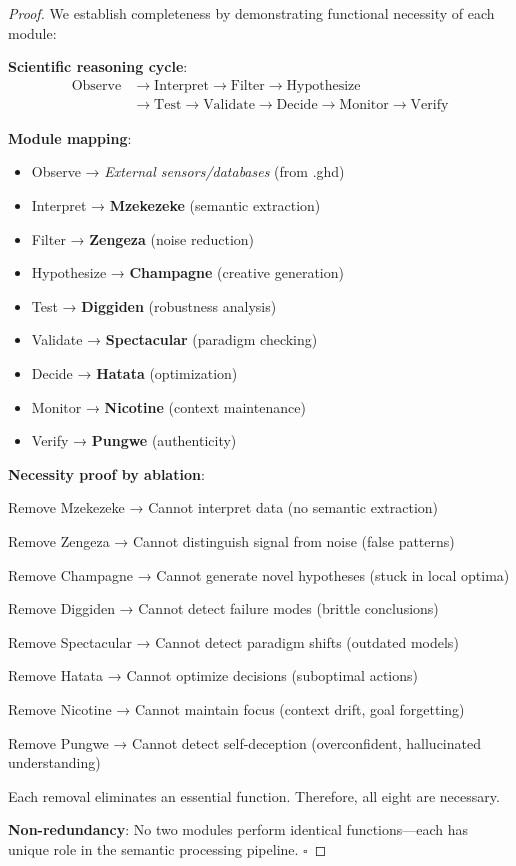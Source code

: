\begin{proof}
We establish completeness by demonstrating functional necessity of each module:

\textbf{Scientific reasoning cycle}:
\begin{align}
\text{Observe} &\to \text{Interpret} \to \text{Filter} \to \text{Hypothesize} \\
&\to \text{Test} \to \text{Validate} \to \text{Decide} \to \text{Monitor} \to \text{Verify}
\end{align}

\textbf{Module mapping}:
\begin{itemize}
\item Observe → \textit{External sensors/databases} (from .ghd)
\item Interpret → \textbf{Mzekezeke} (semantic extraction)
\item Filter → \textbf{Zengeza} (noise reduction)
\item Hypothesize → \textbf{Champagne} (creative generation)
\item Test → \textbf{Diggiden} (robustness analysis)
\item Validate → \textbf{Spectacular} (paradigm checking)
\item Decide → \textbf{Hatata} (optimization)
\item Monitor → \textbf{Nicotine} (context maintenance)
\item Verify → \textbf{Pungwe} (authenticity)
\end{itemize}

\textbf{Necessity proof by ablation}:

Remove Mzekezeke → Cannot interpret data (no semantic extraction)

Remove Zengeza → Cannot distinguish signal from noise (false patterns)

Remove Champagne → Cannot generate novel hypotheses (stuck in local optima)

Remove Diggiden → Cannot detect failure modes (brittle conclusions)

Remove Spectacular → Cannot detect paradigm shifts (outdated models)

Remove Hatata → Cannot optimize decisions (suboptimal actions)

Remove Nicotine → Cannot maintain focus (context drift, goal forgetting)

Remove Pungwe → Cannot detect self-deception (overconfident, hallucinated understanding)

Each removal eliminates an essential function. Therefore, all eight are necessary.

\textbf{Non-redundancy}: No two modules perform identical functions—each has unique role in the semantic processing pipeline. $\square$
\end{proof}

